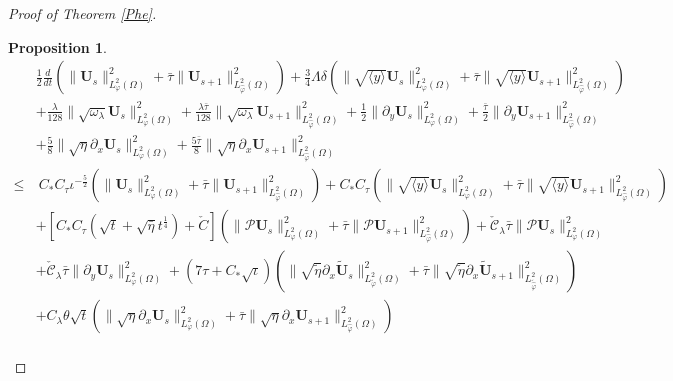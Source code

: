 \documentclass{amsart}
\numberwithin{equation}{section}
\newtheorem{prop}{Proposition}[section]
\newcommand\y{{{\langle y \rangle}}}
\begin{document}
\begin{proof}[Proof of Theorem \ref{Phe}]
\begin{prop}
\begin{align}\label{phe}
&\frac{1}{2}\frac{d}{dt}\left(\|\mathbf{U}_{s}\|_{L_{\varphi}^{2}(\Omega)}^{2}+\bar{\tau}\|\mathbf{U}_{s+1}\|_{L_{\hat{\varphi}}^{2}(\Omega)}^{2}\right)
 +\frac{3}{4}\Lambda\delta\left(\|\sqrt{\y}\mathbf{U}_{s}\|_{L_{\varphi}^{2}(\Omega)}^{2}+\bar{\tau}\|\sqrt{\y}\mathbf{U}_{s+1}\|_{L_{\hat{\varphi}}^{2}(\Omega)}^{2}\right)\\
&+\frac{\lambda}{128}\|\sqrt{\omega_{\lambda}}\mathbf{U}_{s}\|_{L_{\varphi}^{2}(\Omega)}^{2}
 +\frac{\lambda\bar{\tau}}{128}\|\sqrt{\omega_{\lambda}}\mathbf{U}_{s+1}\|_{L_{\hat{\varphi}}^{2}(\Omega)}^{2}
 +\frac{1}{2}\|\partial_{y}\mathbf{U}_{s}\|_{L_{\varphi}^{2}(\Omega)}^{2}
 +\frac{\bar{\tau}}{2}\|\partial_{y}\mathbf{U}_{s+1}\|_{L_{\hat{\varphi}}^{2}(\Omega)}^{2}\nonumber\\
&+\frac{5}{8}\|\sqrt{\eta}\partial_{x}\mathbf{U}_{s}\|_{L_{\varphi}^{2}(\Omega)}^{2}
 +\frac{5\bar{\tau}}{8}\|\sqrt{\eta}\partial_{x}\mathbf{U}_{s+1}\|_{L_{\hat{\varphi}}^{2}(\Omega)}^{2}\nonumber\\
\leq&~C_{*}C_{\tau}\iota^{-\frac{5}{2}}
      \left(\|\mathbf{U}_{s}\|_{L_{\varphi}^{2}(\Omega)}^{2}+\bar{\tau}\|\mathbf{U}_{s+1}\|_{L_{\hat{\varphi}}^{2}(\Omega)}^{2}\right)
      +C_{*}C_{\tau}\left(\|\sqrt{\y}\mathbf{U}_{s}\|_{L_{\varphi}^{2}(\Omega)}^{2}+\bar{\tau}\|\sqrt{\y}\mathbf{U}_{s+1}\|_{L_{\hat{\varphi}}^{2}(\Omega)}^{2}\right)\nonumber\\
    &+\left[C_{*}C_{\tau}(\sqrt{t}+\sqrt{\bar{\eta}}t^{\frac{1}{4}})+\check{C}\right]
      \left(\|\mathcal{P}\mathbf{U}_{s}\|_{L_{\varphi}^{2}(\Omega)}^{2}+\bar{\tau}\|\mathcal{P}\mathbf{U}_{s+1}\|_{L_{\hat{\varphi}}^{2}(\Omega)}^{2}\right)
     +\check{\mathcal{C}}_{\lambda}\bar{\tau}\|\mathcal{P}\mathbf{U}_{s}\|_{L_{\varphi}^{2}(\Omega)}^{2}\nonumber\\
    &+\check{\mathcal{C}}_{\lambda}\bar{\tau}\|\partial_{y}\mathbf{U}_{s}\|_{L_{\varphi}^{2}(\Omega)}^{2}
     +(7\tau+C_{*}\sqrt{\iota})\left(\|\sqrt{\tilde{\eta}}\partial_{x}\tilde{\mathbf{U}}_{s}\|_{L_{\tilde{\varphi}}^{2}(\Omega)}^{2}
                                     +\bar{\tau}\|\sqrt{\tilde{\eta}}\partial_{x}\tilde{\mathbf{U}}_{s+1}\|_{L_{\tilde{\hat{\varphi}}}^{2}(\Omega)}^{2}\right)\nonumber\\
    &+C_{\lambda}\theta\sqrt{t}\left(\|\sqrt{\eta}\partial_{x}\mathbf{U}_{s}\|_{L_{\varphi}^{2}(\Omega)}^{2}
                             +\bar{\tau}\|\sqrt{\eta}\partial_{x}\mathbf{U}_{s+1}\|_{L_{\hat{\varphi}}^{2}(\Omega)}^{2}\right)\nonumber\\

\end{align}
\end{prop}
\end{proof}
\end{document}
